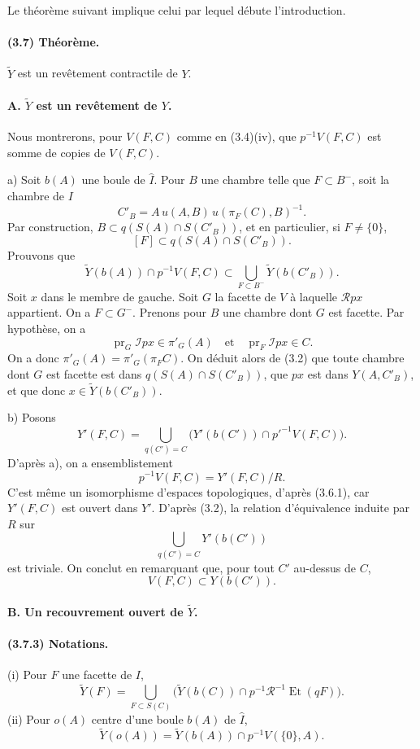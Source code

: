 \documentclass[10pt]{article}
\begin{document}
Le théorème suivant implique celui par lequel débute l'introduction.

\paragraph{(3.7) Théorème.} \(\widetilde Y\) est un revêtement contractile de \(Y\).

\paragraph{A. \(\widetilde Y\) est un revêtement de \(Y\).} Nous montrerons, pour \(V(F,C)\) comme en (3.4)(iv), que \(p^{-1}V(F,C)\) est somme de copies de \(V(F,C)\).

a) Soit \(b(A)\) une boule de \(\widehat I\). Pour \(B\) une chambre telle que \(F\subset B^{-}\), soit la chambre de \(I\)
\[
C'_B=A\,u(A,B)\,u(\pi_F(C),B)^{-1}.
\]
Par construction, \(B\subset q(S(A)\cap S(C'_B))\), et en particulier, si \(F\ne\{0\}\),
\[
\tag{3.7.1}
[F]\subset q(S(A)\cap S(C'_B)).
\]
Prouvons que
\[
\tag{3.7.2}
\widetilde Y(b(A))\cap p^{-1}V(F,C)
\subset
\bigcup_{F\subset B^-}\widetilde Y(b(C'_B)).
\]
Soit \(x\) dans le membre de gauche. Soit \(G\) la facette de \(V\) à laquelle \(\mathcal Rpx\) appartient. On a \(F\subset G^{-}\). Prenons pour \(B\) une chambre dont \(G\) est facette. Par hypothèse, on a
\[
\operatorname{pr}_G\mathcal Ipx\in\pi'_G(A)
\quad\text{et}\quad
\operatorname{pr}_F\mathcal Ipx\in C.
\]
On a donc \(\pi'_G(A)=\pi'_G(\pi_FC)\). On déduit alors de (3.2) que toute chambre dont \(G\) est facette est dans \(q(S(A)\cap S(C'_B))\), que \(px\) est dans \(Y(A,C'_B)\), et que donc \(x\in \widetilde Y(b(C'_B))\).

b) Posons
\[
Y'(F,C)=
\bigcup_{q(C')=C}
\bigl(Y'(b(C'))\cap p'^{-1}V(F,C)\bigr).
\]
D'après a), on a ensemblistement
\[
p^{-1}V(F,C)=Y'(F,C)/R.
\]
C'est même un isomorphisme d'espaces topologiques, d'après (3.6.1), car \(Y'(F,C)\) est ouvert dans \(Y'\). D'après (3.2), la relation d'équivalence induite par \(R\) sur
\[
\bigcup_{q(C')=C}Y'(b(C'))
\]
est triviale. On conclut en remarquant que, pour tout \(C'\) au-dessus de \(C\),
\[
V(F,C)\subset Y(b(C')).
\]

\paragraph{B. Un recouvrement ouvert de \(\widetilde Y\).}

\paragraph{(3.7.3) Notations.} (i) Pour \(F\) une facette de \(I\),
\[
\widetilde Y(F)=
\bigcup_{F\subset S(C)}
\bigl(\widetilde Y(b(C))\cap p^{-1}\mathcal R^{-1}\operatorname{Et}(qF)\bigr).
\]
(ii) Pour \(o(A)\) centre d'une boule \(b(A)\) de \(\widehat I\),
\[
\widetilde Y(o(A))=\widetilde Y(b(A))\cap p^{-1}V(\{0\},A).
\]
\end{document}
